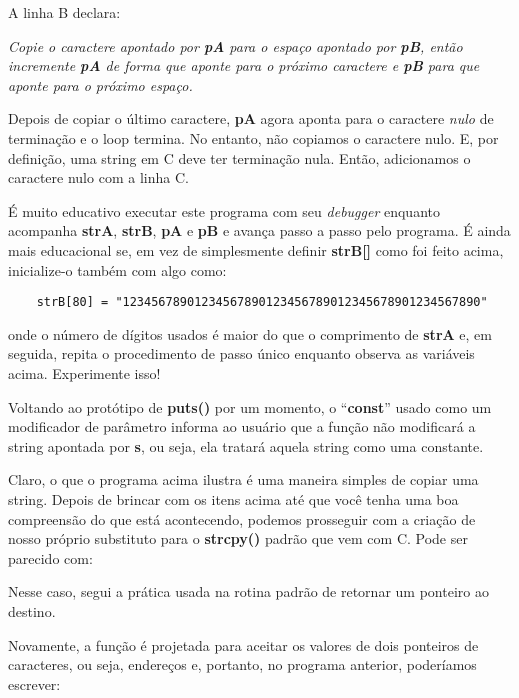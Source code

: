 A linha B declara: 

\textit{Copie o caractere apontado por \textbf{pA} para o espaço apontado por \textbf{pB}, então incremente \textbf{pA} de forma que aponte para o próximo caractere e \textbf{pB} para que aponte para o próximo espaço.}

Depois de copiar o último caractere, \textbf{pA} agora aponta para o caractere \textit{nulo} de terminação e o loop termina. No entanto, não copiamos o caractere nulo. E, por definição, uma string em C deve ter terminação nula. Então, adicionamos o caractere nulo com a linha C.

É muito educativo executar este programa com seu \textit{debugger} enquanto acompanha \textbf{strA}, \textbf{strB}, \textbf{pA} e \textbf{pB} e avança passo a passo pelo programa. É ainda mais educacional se, em vez de simplesmente definir \textbf{strB[]} como foi feito acima, inicialize-o também com algo como:

\begin{lstlisting}
	strB[80] = "12345678901234567890123456789012345678901234567890"
\end{lstlisting}
onde o número de dígitos usados é maior do que o comprimento de \textbf{strA} e, em seguida, repita o procedimento de passo único enquanto observa as variáveis acima. Experimente isso!

Voltando ao protótipo de \textbf{puts()} por um momento, o ``\textbf{const}'' usado como um modificador de parâmetro informa ao usuário que a função não modificará a string apontada por \textbf{s}, ou seja, ela tratará aquela string como uma constante.

Claro, o que o programa acima ilustra é uma maneira simples de copiar uma string. Depois de brincar com os itens acima até que você tenha uma boa compreensão do que está acontecendo, podemos prosseguir com a criação de nosso próprio substituto para o \textbf{strcpy()} padrão que vem com C. Pode ser parecido com:


Nesse caso, segui a prática usada na rotina padrão de retornar um ponteiro ao destino.

Novamente, a função é projetada para aceitar os valores de dois ponteiros de caracteres, ou seja, endereços e, portanto, no programa anterior, poderíamos escrever:


